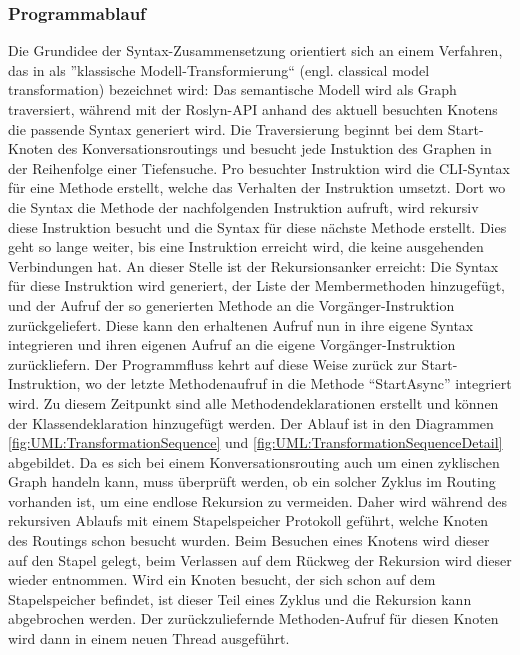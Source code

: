 \subsubsection{Programmablauf}
\label{subsubsec:Programablauf}
Die Grundidee der Syntax-Zusammensetzung orientiert sich an einem Verfahren, das in \cite[S. 272f]{Voelter:13} als ''klassische Modell-Transformierung`` (engl. classical model transformation) bezeichnet wird: Das semantische Modell wird als Graph traversiert, während mit der Roslyn-API anhand des aktuell besuchten Knotens die passende Syntax generiert wird. Die Traversierung beginnt bei dem Start-Knoten des Konversationsroutings und besucht jede Instuktion des Graphen in der Reihenfolge einer Tiefensuche. Pro besuchter Instruktion wird die CLI-Syntax für eine Methode erstellt, welche das Verhalten der Instruktion umsetzt. Dort wo die Syntax die Methode der nachfolgenden Instruktion aufruft, wird rekursiv diese Instruktion besucht und die Syntax für diese nächste Methode erstellt. Dies geht so lange weiter, bis eine Instruktion erreicht wird, die keine ausgehenden Verbindungen hat. An dieser Stelle ist der Rekursionsanker erreicht: Die Syntax für diese Instruktion wird generiert, der Liste der Membermethoden hinzugefügt, und der Aufruf der so generierten Methode an die Vorgänger-Instruktion zurückgeliefert. Diese kann den erhaltenen Aufruf nun in ihre eigene Syntax integrieren und ihren eigenen Aufruf an die eigene Vorgänger-Instruktion zurückliefern. Der Programmfluss kehrt auf diese Weise zurück zur Start-Instruktion, wo der letzte Methodenaufruf in die Methode ``StartAsync'' integriert wird. Zu diesem Zeitpunkt sind alle Methodendeklarationen erstellt und können der Klassendeklaration hinzugefügt werden. Der Ablauf ist in den Diagrammen \ref{fig:UML:TransformationSequence} und \ref{fig:UML:TransformationSequenceDetail} abgebildet.
\newline
Da es sich bei einem Konversationsrouting auch um einen zyklischen Graph handeln kann, muss überprüft werden, ob ein solcher Zyklus im Routing vorhanden ist, um eine endlose Rekursion zu vermeiden. Daher wird während des rekursiven Ablaufs mit einem Stapelspeicher Protokoll geführt, welche Knoten des Routings schon besucht wurden. Beim Besuchen eines Knotens wird dieser auf den Stapel gelegt, beim Verlassen auf dem Rückweg der Rekursion wird dieser wieder entnommen. Wird ein Knoten besucht, der sich schon auf dem Stapelspeicher befindet, ist dieser Teil eines Zyklus und die Rekursion kann abgebrochen werden. Der zurückzuliefernde Methoden-Aufruf für diesen Knoten wird dann in einem neuen Thread ausgeführt. 
